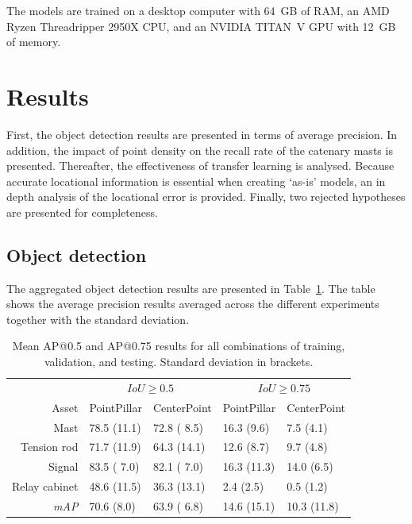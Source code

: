 The models are trained on a desktop computer with 64~GB of RAM, an AMD Ryzen Threadripper 2950X CPU, and an NVIDIA TITAN~V GPU with 12~GB of memory.

\section{Results}
First, the object detection results are presented in terms of average precision. In addition, the impact of point density on the recall rate of the catenary masts is presented. Thereafter, the effectiveness of transfer learning is analysed. Because accurate locational information is essential when creating `as-is' models, an in depth analysis of the locational error is provided. Finally, two rejected hypotheses are presented for completeness.

\subsection{Object detection}
The aggregated object detection results are presented in Table~\ref{tbl:objdet:mAP}. The table shows the average precision results averaged across the different experiments together with the standard deviation.

\begin{table}[ht]
    \centering
    \begin{tabular}{rllll}
        \toprule
        & \multicolumn{2}{c}{$IoU \ge 0.5$} & \multicolumn{2}{c}{$IoU \ge 0.75$}\\
        \cmidrule(lr){2-3} \cmidrule(lr){4-5}
        Asset & PointPillar & CenterPoint & PointPillar & CenterPoint\\
        \midrule
        Mast &          78.5 (11.1) & 72.8 ( 8.5) & 16.3  (9.6) &  7.5 (4.1)\\
        Tension rod &   71.7 (11.9) & 64.3 (14.1) & 12.6  (8.7) &  9.7 (4.8)\\
        Signal &        83.5 ( 7.0) & 82.1 ( 7.0) & 16.3 (11.3) & 14.0 (6.5)\\
        Relay cabinet & 48.6 (11.5) & 36.3 (13.1) &  2.4  (2.5) &  0.5 (1.2)\\
        \midrule
        \textit{mAP}  & 70.6 (8.0) & 63.9 ( 6.8) & 14.6 (15.1) & 10.3 (11.8)\\
        \bottomrule
    \end{tabular}
    \caption{Mean AP@0.5 and AP@0.75 results for all combinations of training, validation, and testing. Standard deviation in brackets.}
    \label{tbl:objdet:mAP}
\end{table}

